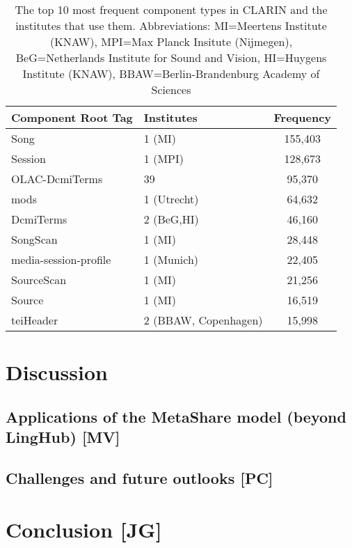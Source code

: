 \documentclass{llncs}
\begin{document}
\begin{table}
    \begin{center}
    \begin{tabular}{l|lc}
        Component Root Tag & Institutes & Frequency \\
        \hline
        Song               & 1 (MI)     & 155,403   \\
        Session            & 1 (MPI)    & 128,673   \\
        OLAC-DcmiTerms     & 39         &  95,370   \\
        mods               & 1 (Utrecht)&  64,632   \\
        DcmiTerms          & 2 (BeG,HI) &  46,160   \\
        SongScan           & 1 (MI)     &  28,448   \\
        media-session-profile  & 1 (Munich) &  22,405   \\
        SourceScan         & 1 (MI)     &  21,256   \\
        Source             & 1 (MI)     &  16,519   \\
        teiHeader          & 2 (BBAW, Copenhagen) &  15,998   \\
    \end{tabular}
    \end{center}
    \caption{\label{tab:clarin-types}The top 10 most frequent component types in
    CLARIN and the institutes that use them. Abbreviations: MI=Meertens Institute (KNAW), 
    MPI=Max Planck Insitute (Nijmegen), BeG=Netherlands Institute for Sound and Vision,
HI=Huygens Institute (KNAW), BBAW=Berlin-Brandenburg Academy of Sciences}
\end{table}

\section{Discussion}
\label{sec:discussion}

\subsection{Applications of the MetaShare model (beyond LingHub) [MV]}
\label{sec:applications}

\subsection{Challenges and future outlooks [PC]}
\label{sec:challenges}

\section{Conclusion [JG]}
\label{sec:conclusion}



\end{document}
